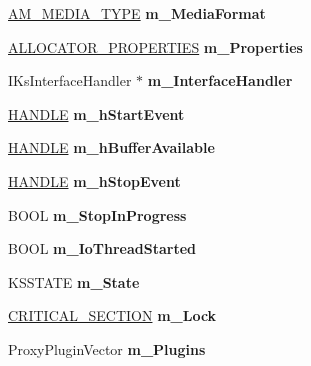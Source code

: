 \begin{DoxyCompactItemize}
\item 
\mbox{\label{class_c_output_pin_ac01ca2646abe82488b4fc3ef54769c0f}} 
\hyperlink{struct_a_m___m_e_d_i_a___t_y_p_e}{A\+M\+\_\+\+M\+E\+D\+I\+A\+\_\+\+T\+Y\+PE} {\bfseries m\+\_\+\+Media\+Format}
\item 
\mbox{\label{class_c_output_pin_a06f846afaf0e480d5594334488990734}} 
\hyperlink{struct___allocator_properties}{A\+L\+L\+O\+C\+A\+T\+O\+R\+\_\+\+P\+R\+O\+P\+E\+R\+T\+I\+ES} {\bfseries m\+\_\+\+Properties}
\item 
\mbox{\label{class_c_output_pin_a0334f16455999817cbd5aa6577c91d76}} 
I\+Ks\+Interface\+Handler $\ast$ {\bfseries m\+\_\+\+Interface\+Handler}
\item 
\mbox{\label{class_c_output_pin_a488dbab98aa4be5828f8c4f5d9dea2cd}} 
\hyperlink{interfacevoid}{H\+A\+N\+D\+LE} {\bfseries m\+\_\+h\+Start\+Event}
\item 
\mbox{\label{class_c_output_pin_a51cb6fa955d93c60c09b72b6b98a8a0e}} 
\hyperlink{interfacevoid}{H\+A\+N\+D\+LE} {\bfseries m\+\_\+h\+Buffer\+Available}
\item 
\mbox{\label{class_c_output_pin_aa3041b4c5e77c0dd0497b4eb5cc11263}} 
\hyperlink{interfacevoid}{H\+A\+N\+D\+LE} {\bfseries m\+\_\+h\+Stop\+Event}
\item 
\mbox{\label{class_c_output_pin_a3a7ac230c3efbed76a2b2a6681ac5004}} 
B\+O\+OL {\bfseries m\+\_\+\+Stop\+In\+Progress}
\item 
\mbox{\label{class_c_output_pin_a9716702d2d985173dab4f4e6acb32773}} 
B\+O\+OL {\bfseries m\+\_\+\+Io\+Thread\+Started}
\item 
\mbox{\label{class_c_output_pin_aac4304ba6e73387923fb8d2e97216322}} 
K\+S\+S\+T\+A\+TE {\bfseries m\+\_\+\+State}
\item 
\mbox{\label{class_c_output_pin_ab1f4d25455c733f04dc1bf9ff9ea80de}} 
\hyperlink{struct___c_r_i_t_i_c_a_l___s_e_c_t_i_o_n}{C\+R\+I\+T\+I\+C\+A\+L\+\_\+\+S\+E\+C\+T\+I\+ON} {\bfseries m\+\_\+\+Lock}
\item 
\mbox{\label{class_c_output_pin_a7bcdf7c9fe6f93278ab6e0c4c9faa5fc}} 
Proxy\+Plugin\+Vector {\bfseries m\+\_\+\+Plugins}
\end{DoxyCompactItemize}

